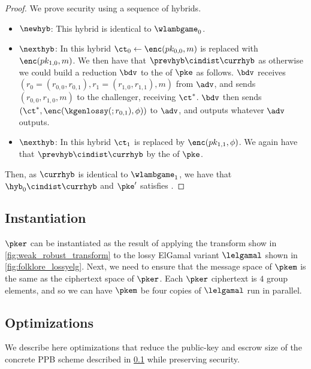 \begin{proof}
	We prove security using a sequence of hybrids.

	\begin{itemize}
		\item $\newhyb$: This hybrid is identical to $\wlambgame_0$.
		\item $\nexthyb$: In this hybrid $\ct_0 \leftarrow \enc(pk_{0, 0}, m)$ is replaced with $\enc(pk_{1, 0}, m)$.
		      We then have that $\prevhyb \cindist \currhyb$ as otherwise we could build a reduction $\bdv$ to the \wla{} of $\pke$ as follows.
		      $\bdv$ receives $(r_0 = (r_{0, 0}, r_{0, 1}), r_1 = (r_{1, 0}, r_{1, 1}), m)$ from $\adv$, and sends $(r_{0, 0}, r_{1, 0}, m)$ to the challenger, receiving $\ct^*$.
		      $\bdv$ then sends $(\ct^*, \enc(\kgenlossy(;r_{0, 1}), \phi))$ to $\adv$, and outputs whatever $\adv$ outputs.
		\item $\nexthyb$: In this hybrid $\ct_1$ is replaced by $\enc(pk_{1, 1}, \phi)$.
		      We again have that $\prevhyb \cindist \currhyb$ by the \wla{} of $\pke$.
	\end{itemize}

	Then, as $\currhyb$ is identical to $\wlambgame_1$, we have that $\hyb_0 \cindist \currhyb$ and $\pke'$ satisfies \wla{}.
\end{proof}

\subsection{Instantiation}
\label{sec:instantiation}

$\pker$ can be instantiated as the result of applying the transform show in \cref{fig:weak_robust_transform} to the lossy ElGamal variant $\lelgamal$ shown in \cref{fig:folklore_lossyelg}.
Next, we need to ensure that the message space of $\pkem$ is the same as the ciphertext space of $\pker$.
Each $\pker$ ciphertext is $4$ group elements, and so we can have $\pkem$ be four copies of $\lelgamal$ run in parallel.


\subsection{Optimizations}
\label{sec:ppb-optimizations}
We describe here optimizations that reduce the public-key and escrow size of the concrete PPB scheme described in \cref{sec:instantiation} while preserving security.

